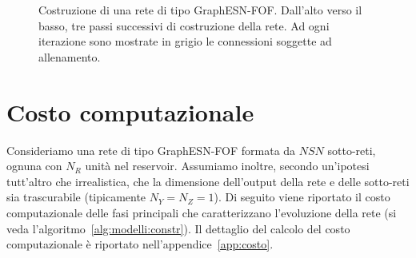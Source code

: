 \begin{figure}[p]
\centering
{}\\
\vspace*{0.4cm}
\\
\vspace*{0.4cm}
\vspace*{0.4cm}
\medskip
\caption[Costruzione di una rete.]{Costruzione di una rete di tipo GraphESN-FOF. Dall'alto verso il basso, tre passi successivi di costruzione della rete. Ad ogni iterazione sono mostrate in grigio le connessioni soggette ad allenamento.}
\label{fig:modelli:evoluzione}
\end{figure}


\section{Costo computazionale}\label{sec:modelli:costo}
Consideriamo una rete di tipo GraphESN-FOF formata da $\mathit{NSN}$ sotto-reti, ognuna con $N_R$ unità nel reservoir. Assumiamo inoltre, secondo un'ipotesi tutt'altro che irrealistica, che la dimensione dell'output della rete e delle sotto-reti sia trascurabile (tipicamente $N_Y = N_Z = 1$). Di seguito viene riportato il costo computazionale delle fasi principali che caratterizzano l'evoluzione della rete (si veda l'algoritmo~\vref{alg:modelli:constr}). Il dettaglio del calcolo del costo computazionale è riportato nell'appendice~\ref{app:costo}.

